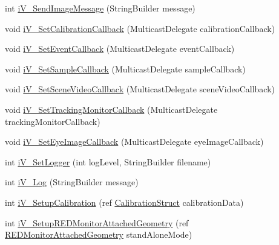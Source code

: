\begin{DoxyCompactItemize}
\item 
int \hyperlink{class_web_analyzer_1_1_eye_tracking_1_1_eye_tracking_controller_aeca9fd1da5ea052b9344770778d660c0}{i\+V\+\_\+\+Send\+Image\+Message} (String\+Builder message)
\item 
void \hyperlink{class_web_analyzer_1_1_eye_tracking_1_1_eye_tracking_controller_a4feb326c106556d7a7fc98a1e1b606c1}{i\+V\+\_\+\+Set\+Calibration\+Callback} (Multicast\+Delegate calibration\+Callback)
\item 
void \hyperlink{class_web_analyzer_1_1_eye_tracking_1_1_eye_tracking_controller_a0583c1d3ffba6023fd798aa54506c87c}{i\+V\+\_\+\+Set\+Event\+Callback} (Multicast\+Delegate event\+Callback)
\item 
void \hyperlink{class_web_analyzer_1_1_eye_tracking_1_1_eye_tracking_controller_a4c01964a370aee13b71f2c13dad03d5f}{i\+V\+\_\+\+Set\+Sample\+Callback} (Multicast\+Delegate sample\+Callback)
\item 
void \hyperlink{class_web_analyzer_1_1_eye_tracking_1_1_eye_tracking_controller_a1078dc05ce1ec37cf3e1292edaa18990}{i\+V\+\_\+\+Set\+Scene\+Video\+Callback} (Multicast\+Delegate scene\+Video\+Callback)
\item 
void \hyperlink{class_web_analyzer_1_1_eye_tracking_1_1_eye_tracking_controller_ab30f1d6155b8e5a6695984e4bb228b12}{i\+V\+\_\+\+Set\+Tracking\+Monitor\+Callback} (Multicast\+Delegate tracking\+Monitor\+Callback)
\item 
void \hyperlink{class_web_analyzer_1_1_eye_tracking_1_1_eye_tracking_controller_ae2b8be1fede54b23cb6a9b9a1c415ca3}{i\+V\+\_\+\+Set\+Eye\+Image\+Callback} (Multicast\+Delegate eye\+Image\+Callback)
\item 
int \hyperlink{class_web_analyzer_1_1_eye_tracking_1_1_eye_tracking_controller_a13de540c735ced48a847b5aa21dc141d}{i\+V\+\_\+\+Set\+Logger} (int log\+Level, String\+Builder filename)
\item 
int \hyperlink{class_web_analyzer_1_1_eye_tracking_1_1_eye_tracking_controller_a4d8c5ffa82586a8458808864b3d3235d}{i\+V\+\_\+\+Log} (String\+Builder message)
\item 
int \hyperlink{class_web_analyzer_1_1_eye_tracking_1_1_eye_tracking_controller_aa61bd048ca8ecf45aa55eb8e92dadfc0}{i\+V\+\_\+\+Setup\+Calibration} (ref \hyperlink{struct_web_analyzer_1_1_eye_tracking_1_1_eye_tracking_controller_1_1_calibration_struct}{Calibration\+Struct} calibration\+Data)
\item 
int \hyperlink{class_web_analyzer_1_1_eye_tracking_1_1_eye_tracking_controller_a4d9502cfbe2b2b7d53a546c288a292bf}{i\+V\+\_\+\+Setup\+R\+E\+D\+Monitor\+Attached\+Geometry} (ref \hyperlink{struct_web_analyzer_1_1_eye_tracking_1_1_eye_tracking_controller_1_1_r_e_d_monitor_attached_geometry}{R\+E\+D\+Monitor\+Attached\+Geometry} stand\+Alone\+Mode)

\end{DoxyCompactItemize}
